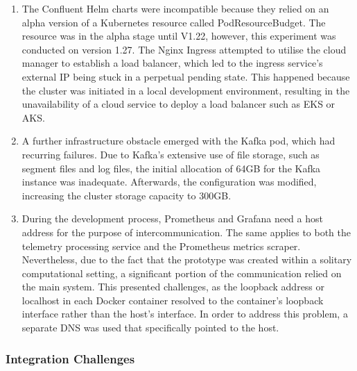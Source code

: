 \documentclass[preprint,12pt]{elsarticle}
\begin{document}
\begin{enumerate}[label=({\alph*}) , leftmargin=30px]

    \item The Confluent Helm charts were incompatible because they relied on an alpha version of a Kubernetes resource called PodResourceBudget. The resource was in the alpha stage until V1.22, however, this experiment was conducted on version 1.27. The Nginx Ingress attempted to utilise the cloud manager to establish a load balancer, which led to the ingress service's external IP being stuck in a perpetual pending state. This happened because the cluster was initiated in a local development environment, resulting in the unavailability of a cloud service to deploy a load balancer such as EKS or AKS.

    \item A further infrastructure obstacle emerged with the Kafka pod, which had recurring failures. Due to Kafka's extensive use of file storage, such as segment files and log files, the initial allocation of 64GB for the Kafka instance was inadequate. Afterwards, the configuration was modified, increasing the cluster storage capacity to 300GB.

    \item During the development process, Prometheus and Grafana need a host address for the purpose of intercommunication. The same applies to both the telemetry processing service and the Prometheus metrics scraper. Nevertheless, due to the fact that the prototype was created within a solitary computational setting, a significant portion of the communication relied on the main system. This presented challenges, as the loopback address or localhost in each Docker container resolved to the container's loopback interface rather than the host's interface. In order to address this problem, a separate DNS was used that specifically pointed to the host.

\end{enumerate} 

\subsubsection{Integration Challenges} 
\end{document}
